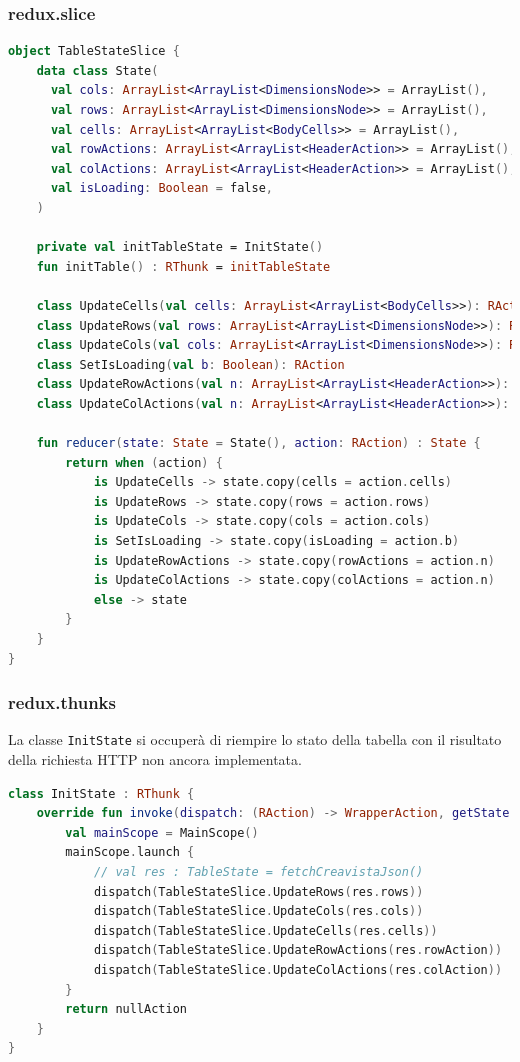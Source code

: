 \subsubsection{redux.slice}
\begin{lstlisting}[caption={TableState}, label={lst:tablestate}, language=Kotlin]
object TableStateSlice {
	data class State(
	  val cols: ArrayList<ArrayList<DimensionsNode>> = ArrayList(),
	  val rows: ArrayList<ArrayList<DimensionsNode>> = ArrayList(),
	  val cells: ArrayList<ArrayList<BodyCells>> = ArrayList(),
	  val rowActions: ArrayList<ArrayList<HeaderAction>> = ArrayList(),
	  val colActions: ArrayList<ArrayList<HeaderAction>> = ArrayList(),
	  val isLoading: Boolean = false,
	)
	
	private val initTableState = InitState()
	fun initTable() : RThunk = initTableState
	
	class UpdateCells(val cells: ArrayList<ArrayList<BodyCells>>): RAction
	class UpdateRows(val rows: ArrayList<ArrayList<DimensionsNode>>): RAction
	class UpdateCols(val cols: ArrayList<ArrayList<DimensionsNode>>): RAction
	class SetIsLoading(val b: Boolean): RAction
	class UpdateRowActions(val n: ArrayList<ArrayList<HeaderAction>>): RAction
	class UpdateColActions(val n: ArrayList<ArrayList<HeaderAction>>): RAction
	
	fun reducer(state: State = State(), action: RAction) : State {
		return when (action) {
			is UpdateCells -> state.copy(cells = action.cells)
			is UpdateRows -> state.copy(rows = action.rows)
			is UpdateCols -> state.copy(cols = action.cols)
			is SetIsLoading -> state.copy(isLoading = action.b)
			is UpdateRowActions -> state.copy(rowActions = action.n)
			is UpdateColActions -> state.copy(colActions = action.n)
			else -> state
		}
	}
}
\end{lstlisting}

\subsubsection{redux.thunks}
La classe \verb|InitState| si occuperà di riempire lo stato della tabella con il risultato della richiesta HTTP non ancora implementata.
\begin{lstlisting}[caption={TableState}, label={lst:tablestate}, language=Kotlin]
class InitState : RThunk {
	override fun invoke(dispatch: (RAction) -> WrapperAction, getState: () -> AppState): WrapperAction {
		val mainScope = MainScope()
		mainScope.launch {
			// val res : TableState = fetchCreavistaJson()
			dispatch(TableStateSlice.UpdateRows(res.rows))
			dispatch(TableStateSlice.UpdateCols(res.cols))
			dispatch(TableStateSlice.UpdateCells(res.cells))
			dispatch(TableStateSlice.UpdateRowActions(res.rowAction))
			dispatch(TableStateSlice.UpdateColActions(res.colAction))
		}
		return nullAction
	}
}
\end{lstlisting}


